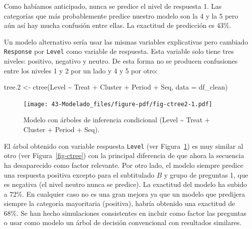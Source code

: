 \documentclass[
  12pt,
  a4paper,
  extrafontsizes,
  onecolumn,
  openright]{memoir}
\newenvironment{Shaded}{\begin{snugshade}}{\end{snugshade}}
\newcommand{\AttributeTok}[1]{\textcolor[rgb]{0.40,0.45,0.13}{#1}}
\newcommand{\FloatTok}[1]{\textcolor[rgb]{0.68,0.00,0.00}{#1}}
\newcommand{\FunctionTok}[1]{\textcolor[rgb]{0.28,0.35,0.67}{#1}}
\newcommand{\NormalTok}[1]{\textcolor[rgb]{0.00,0.23,0.31}{#1}}
\newcommand{\OtherTok}[1]{\textcolor[rgb]{0.00,0.23,0.31}{#1}}
\newcommand{\SpecialCharTok}[1]{\textcolor[rgb]{0.37,0.37,0.37}{#1}}
\begin{document}
\normalsize

Como habíamos anticipado, nunca se predice el nivel de respuesta 1. Las
categorías que más probablemente predice nuestro modelo son la 4 y la 5
pero aún así hay mucha confusión entre ellas. La exactitud de predicción
es 43\%.

Un modelo alternativo sería usar las mismas variables explicativas pero
cambiado \texttt{Response} por \texttt{Level} como variable de
respuesta. Esta variable solo tiene tres niveles: positivo, negativo y
neutro. De esta forma no se producen confusiones entre los niveles 1 y 2
por un lado y 4 y 5 por otro:

\scriptsize

\begin{Shaded}
\begin{Highlighting}[]
\NormalTok{tree}\FloatTok{.2} \OtherTok{\textless{}{-}} \FunctionTok{ctree}\NormalTok{(Level }\SpecialCharTok{\textasciitilde{}}\NormalTok{ Treat }\SpecialCharTok{+}\NormalTok{ Cluster }\SpecialCharTok{+}\NormalTok{ Period }\SpecialCharTok{+}\NormalTok{ Seq, }\AttributeTok{data =}\NormalTok{ df\_clean)}
\end{Highlighting}
\end{Shaded}

\normalsize

\begin{figure}[h]

{\centering \texttt{[image: 43-Modelado\_files/figure-pdf/fig-ctree2-1.pdf]}

}

\caption{\label{fig-ctree2}Modelo con árboles de inferencia condicional
(Level \textasciitilde{} Treat + Cluster + Period + Seq).}

\end{figure}

El árbol obtenido con variable respuesta \texttt{Level} (ver
Figura~\ref{fig-ctree2}) es muy similar al otro (ver
Figura~\ref{fig-ctree}) con la principal diferencia de que ahora la
secuencia ha desaparecido como factor relevante. Por otro lado, el
modelo siempre predice una respuesta positiva excepto para el
subtitulado \(B\) y grupo de preguntas 1, que es negativa (el nivel
neutro nunca se predice). La exactitud del modelo ha subido a 72\%. En
cualquier caso no es una gran mejora ya que un modelo que predijera
siempre la categoría mayoritaria (positiva), habría obtenido una
exactitud de 68\%. Se han hecho simulaciones consistentes en incluir
como factor las preguntas o usar como modelo un árbol de decisión
convencional con resultados similares.
\end{document}
